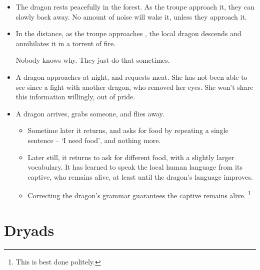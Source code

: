 \begin{multicols}{2}
\showStdSpells

\showEnc[E]

\begin{itemize}
  \item
  The dragon rests peacefully in the forest.
  As the troupe approach it, they can slowly back away.
  No amount of noise will wake it, unless they approach it.
  \item
  In the distance, as the troupe approaches , the local dragon descends and annihilates it in a torrent of fire.

  Nobody knows why.
  They just do that sometimes.
  \item
  A dragon approaches  at night, and requests meat.
  She has not been able to see since a fight with another dragon, who removed her eyes.
  She won't share this information willingly, out of pride.
  \item
  A dragon arrives, grabs someone, and flies away.
  \begin{itemize}
    \item
    Sometime later it returns, and asks for food by repeating a single sentence -- `I need food', and nothing more.
    \item
    Later still, it returns to ask for different food, with a slightly larger vocabulary.
    It has learned to speak the local human language from its captive, who remains alive, at least until the dragon's language improves.
    \item
    Correcting the dragon's grammar guarantees the captive remains alive.%
    \footnote{This is best done politely.}
  \end{itemize}
\end{itemize}

\end{multicols}

\section[Dryad]{Dryads}
\label{dryad}


